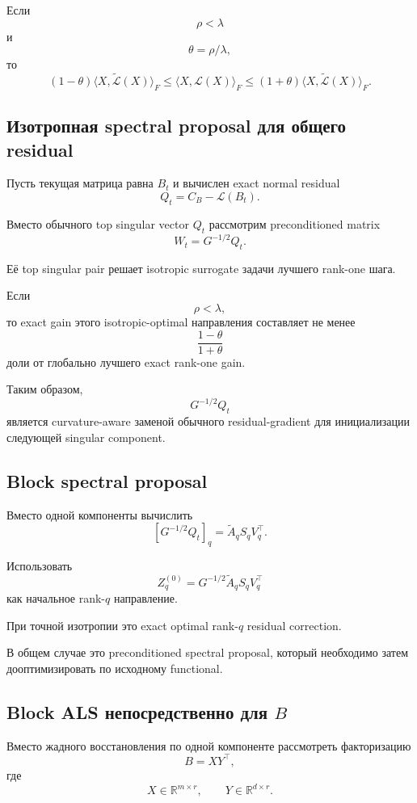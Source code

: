 Если
\[
    \rho<\lambda
\]
и
\[
    \theta=\rho/\lambda,
\]
то
\[
\boxed{
    (1-\theta)
    \langle X,\widetilde{\mathcal L}(X)\rangle_F
    \le
    \langle X,\mathcal L(X)\rangle_F
    \le
    (1+\theta)
    \langle X,\widetilde{\mathcal L}(X)\rangle_F.
}
\]

\subsection{Изотропная spectral proposal для общего residual}

Пусть текущая матрица равна $B_t$ и вычислен exact normal residual
\[
\boxed{
    Q_t
    =
    C_B-\mathcal L(B_t).
}
\]

Вместо обычного top singular vector $Q_t$
рассмотрим preconditioned matrix
\[
\boxed{
    W_t
    =
    G^{-1/2}Q_t.
}
\]

Её top singular pair решает isotropic surrogate задачи
лучшего rank-one шага.

Если
\[
    \rho<\lambda,
\]
то exact gain этого isotropic-optimal направления
составляет не менее
\[
\boxed{
    \frac{1-\theta}{1+\theta}
}
\]
доли от глобально лучшего exact rank-one gain.

Таким образом,
\[
\boxed{
    G^{-1/2}Q_t
}
\]
является curvature-aware заменой обычного residual-gradient
для инициализации следующей singular component.

\subsection{Block spectral proposal}

Вместо одной компоненты вычислить
\[
\boxed{
    [G^{-1/2}Q_t]_q
    =
    \widetilde A_q
    S_q
    V_q^\top.
}
\]

Использовать
\[
\boxed{
    Z_q^{(0)}
    =
    G^{-1/2}
    \widetilde A_q
    S_q
    V_q^\top
}
\]
как начальное rank-$q$ направление.

При точной изотропии это exact optimal rank-$q$ residual correction.

В общем случае это preconditioned spectral proposal,
который необходимо затем дооптимизировать по исходному functional.

\subsection{Block ALS непосредственно для $B$}

Вместо жадного восстановления по одной компоненте
рассмотреть факторизацию
\[
\boxed{
    B=XY^\top,
}
\]
где
\[
    X\in\mathbb R^{m\times r},
    \qquad
    Y\in\mathbb R^{d\times r}.
\]

